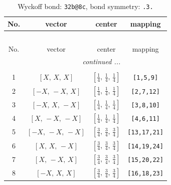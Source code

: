 \documentclass[fleqn,8pt]{jsarticle}
\begin{document}
\begin{longtable}{cccc}
\caption{Wyckoff bond: {\tt 32b@8c}, bond symmetry: {\tt .3.}}
 \\
 \hline \hline
No. & vector & center & mapping \\ \hline \endfirsthead

\multicolumn{3}{l}{\tablename\ \thetable{}} \\
 \hline \hline
No. & vector & center & mapping \\ \hline \endhead

 \hline \hline
\multicolumn{3}{r}{\footnotesize\it continued ...} \\ \endfoot

 \hline \hline
\multicolumn{3}{r}{} \\ \endlastfoot

1 & $\left[ X,\, X,\, X \right]$ & $\left[ \frac{1}{4},\, \frac{1}{4},\, \frac{1}{4} \right]$ & {\tt [1,5,9]} \\ \hline
2 & $\left[ - X,\, - X,\, X \right]$ & $\left[ \frac{1}{4},\, \frac{1}{4},\, \frac{1}{4} \right]$ & {\tt [2,7,12]} \\ \hline
3 & $\left[ - X,\, X,\, - X \right]$ & $\left[ \frac{1}{4},\, \frac{1}{4},\, \frac{1}{4} \right]$ & {\tt [3,8,10]} \\ \hline
4 & $\left[ X,\, - X,\, - X \right]$ & $\left[ \frac{1}{4},\, \frac{1}{4},\, \frac{1}{4} \right]$ & {\tt [4,6,11]} \\ \hline
5 & $\left[ - X,\, - X,\, - X \right]$ & $\left[ \frac{3}{4},\, \frac{3}{4},\, \frac{3}{4} \right]$ & {\tt [13,17,21]} \\ \hline
6 & $\left[ X,\, X,\, - X \right]$ & $\left[ \frac{3}{4},\, \frac{3}{4},\, \frac{3}{4} \right]$ & {\tt [14,19,24]} \\ \hline
7 & $\left[ X,\, - X,\, X \right]$ & $\left[ \frac{3}{4},\, \frac{3}{4},\, \frac{3}{4} \right]$ & {\tt [15,20,22]} \\ \hline
8 & $\left[ - X,\, X,\, X \right]$ & $\left[ \frac{3}{4},\, \frac{3}{4},\, \frac{3}{4} \right]$ & {\tt [16,18,23]} \\
\end{longtable}
\renewcommand{\arraystretch}{1.2}
\end{document}
